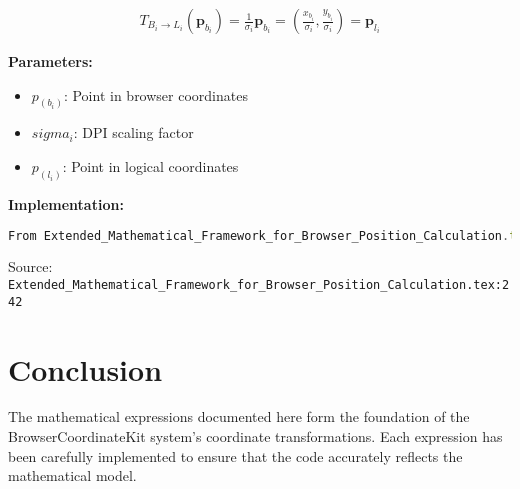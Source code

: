 \documentclass{article}
\begin{document}
\begin{align}
T_{B_i \to L_i}(\bm{p}_{b_i}) = \frac{1}{\sigma_i}\bm{p}_{b_i} = \left(\frac{x_{b_i}}{\sigma_i}, \frac{y_{b_i}}{\sigma_i}\right) = \bm{p}_{l_i}
\end{align}

\textbf{Parameters:}

\begin{itemize}
\item $p_(b_i)$: Point in browser coordinates
\item $sigma_i$: DPI scaling factor
\item $p_(l_i)$: Point in logical coordinates
\end{itemize}

\textbf{Implementation:}

\begin{lstlisting}[language=TypeScript, basicstyle=\small\ttfamily]
From Extended_Mathematical_Framework_for_Browser_Position_Calculation.tex
\end{lstlisting}

Source: \texttt{Extended_Mathematical_Framework_for_Browser_Position_Calculation.tex:242}

\section{Conclusion}

The mathematical expressions documented here form the foundation of the BrowserCoordinateKit system's coordinate transformations.
Each expression has been carefully implemented to ensure that the code accurately reflects the mathematical model.
\end{document}
